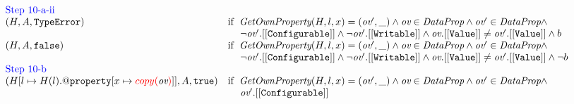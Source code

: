 \documentclass[a4paper, leqno]{amsart}
\def\inred{\color{red}}
\def\inblue{\color{blue}}
\newcommand{\false}{{\tt false}}
\newcommand{\true}{{\tt true}}
\newcommand{\te}{{\tt TypeError}}
\newcommand{\hf}[1]{\emph{#1}}
\newcommand{\ifc}[1]{{\rm if}\begin{array}[t]{l}#1\end{array}}
\def\inred{\color{red}}
\def\inblue{\color{blue}}
\begin{document}
\[\begin{array}{l@{}c@{}l}
{\begin{array}{ll}
\multicolumn{2}{l}{\mbox{\inblue Step 10-a-ii}}\\
(H,A,\te)
&\ifc{\hf{GetOwnProperty}(H,l,x) = (\emph{ov}', \_) \wedge
\emph{ov} \in \emph{DataProp} \wedge
\emph{ov}' \in \emph{DataProp} \wedge}\\
&\mbox{\phantom{if \ }$
\neg \emph{ov}'.{\tt[[Configurable]]} \wedge \neg\emph{ov}'.{\tt[[Writable]]} \wedge
\emph{ov}.{\tt[[Value]]} \not= \emph{ov}'.{\tt[[Value]]} \wedge b$}\\

(H,A,\false)
&\ifc{\hf{GetOwnProperty}(H,l,x) = (\emph{ov}', \_) \wedge
\emph{ov} \in \emph{DataProp} \wedge
\emph{ov}' \in \emph{DataProp} \wedge}\\
&\mbox{\phantom{if \ }$\neg \emph{ov}'.{\tt[[Configurable]]} \wedge \neg\emph{ov}'.{\tt[[Writable]]} \wedge
\emph{ov}.{\tt[[Value]]} \not= \emph{ov}'.{\tt[[Value]]} \wedge \neg b$}\\

\multicolumn{2}{l}{\mbox{\inblue Step 10-b}}\\
(H[l\mapsto H(l).{\tt@property}[x\mapsto{\inred copy(}\emph{ov}{\inred)}]], A,\true)
&\ifc{\hf{GetOwnProperty}(H,l,x) = (\emph{ov}', \_) \wedge
\emph{ov} \in \emph{DataProp} \wedge
\emph{ov}' \in \emph{DataProp} \wedge}\\
&\mbox{\phantom{if \ }$\emph{ov}'.{\tt[[Configurable]]}$}\\


\end{array}}
\end{array}\]
\end{document}
